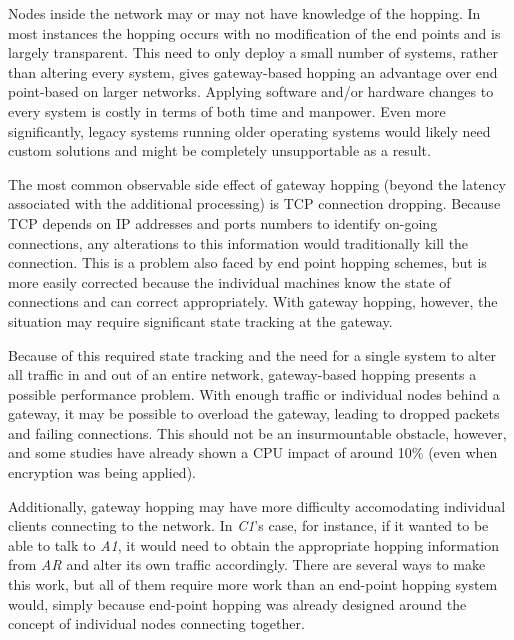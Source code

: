 \par Nodes inside the network may or may not have knowledge of the hopping. In most instances the hopping occurs with no modification of the end points and is largely transparent.  This need to only deploy a small number of systems, rather than altering every system, gives gateway-based hopping an advantage over end point-based on larger networks. Applying software and/or hardware changes to every system is costly in terms of both time and manpower. Even more significantly, legacy systems running older operating systems would likely need custom solutions and might be completely unsupportable as a result.

\par The most common observable side effect of gateway hopping (beyond the latency associated with the additional processing) is TCP connection dropping. Because TCP depends on IP addresses and ports numbers to identify on-going connections, any alterations to this information would traditionally kill the connection. This is a problem also faced by end point hopping schemes, but is more easily corrected because the individual machines know the state of connections and can correct appropriately. With gateway hopping, however, the situation may require significant state tracking at the gateway.

\par Because of this required state tracking and the need for a single system to alter all traffic in and out of an entire network, gateway-based hopping presents a possible performance problem. With enough traffic or individual nodes behind a gateway, it may be possible to overload the gateway, leading to dropped packets and failing connections. This should not be an insurmountable obstacle, however, and some studies have already shown a CPU impact of around 10\% \cite{TAO} (even when encryption was being applied).

\par Additionally, gateway hopping may have more difficulty accomodating individual clients connecting to the network. In \textit{C1}'s case, for instance, if it wanted to be able to talk to \textit{A1}, it would need to obtain the appropriate hopping information from \textit{AR} and alter its own traffic accordingly. There are several ways to make this work, but all of them require more work than an end-point hopping system would, simply because end-point hopping was already designed around the concept of individual nodes connecting together.

